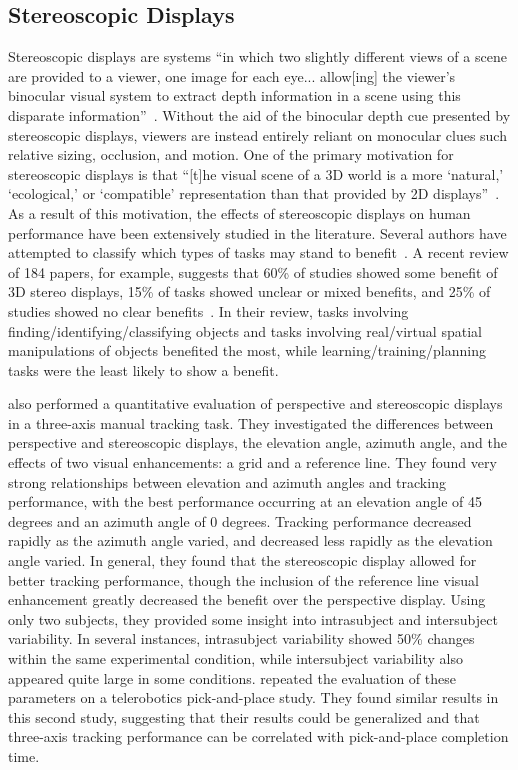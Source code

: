 \subsection{Stereoscopic Displays}
Stereoscopic displays are systems ``in which two slightly different views of a scene are provided to a viewer, one image for each eye... allow[ing] the viewer's binocular visual system to extract depth information in a scene using this disparate information''~\citep{mcintire_stereoscopic_2014}.
Without the aid of the binocular depth cue presented by stereoscopic displays, viewers are instead entirely reliant on monocular clues such relative sizing, occlusion, and motion.
One of the primary motivation for stereoscopic displays is that ``[t]he visual scene of a 3D world is a more `natural,' `ecological,' or `compatible' representation than that provided by 2D displays''~\citep{wickens_three-dimensional_1990}.
As a result of this motivation, the effects of stereoscopic displays on human performance have been extensively studied in the literature.
Several authors have attempted to classify which types of tasks may stand to benefit~\citep{wickens_three-dimensional_1989, wickens_three-dimensional_1990, naikar_perspective_1998, dixon_human_2009, mcintire_stereoscopic_2014}.
A recent review of 184 papers, for example, suggests that 60\% of studies showed some benefit of 3D stereo displays, 15\% of tasks showed unclear or mixed benefits, and 25\% of studies showed no clear benefits~\citep{mcintire_stereoscopic_2014}.
In their review, tasks involving finding/identifying/classifying objects and tasks involving real/virtual spatial manipulations of objects benefited the most, while learning/training/planning tasks were the least likely to show a benefit.

\citeauthor{kim_quantitative_1987} also performed a quantitative evaluation of perspective and stereoscopic displays in a three-axis manual tracking task.
They investigated the differences between perspective and stereoscopic displays, the elevation angle, azimuth angle, and the effects of two visual enhancements: a grid and a reference line.
They found very strong relationships between elevation and azimuth angles and tracking performance, with the best performance occurring at an elevation angle of 45 degrees and an azimuth angle of 0 degrees.
Tracking performance decreased rapidly as the azimuth angle varied, and decreased less rapidly as the elevation angle varied.
In general, they found that the stereoscopic display allowed for better tracking performance, though the inclusion of the reference line visual enhancement greatly decreased the benefit over the perspective display.
Using only two subjects, they provided some insight into intrasubject and intersubject variability.
In several instances, intrasubject variability showed 50\% changes within the same experimental condition, while intersubject variability also appeared quite large in some conditions.
\citeauthor{kim_visual_1987} repeated the evaluation of these parameters on a telerobotics pick-and-place study.
They found similar results in this second study, suggesting that their results could be generalized and that three-axis tracking performance can be correlated with pick-and-place completion time.


